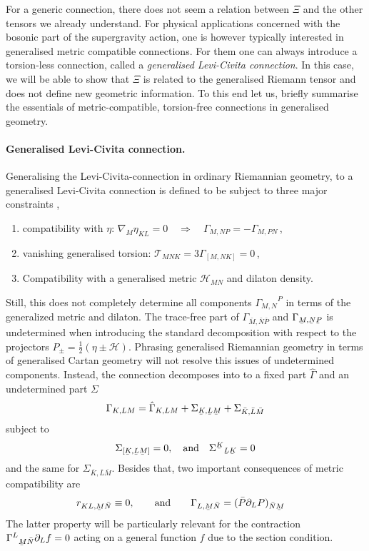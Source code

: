 \documentclass[11pt,a4paper]{article}
\numberwithin{equation}{section}
\newcommand{\ubar}[1]{\underaccent{\bar}{#1}}
\newcommand{\bN}{\bar{N}}
\newcommand{\bP}{\bar{P}}
\newcommand{\ubK}{\ubar{K}}
\newcommand{\ubL}{\ubar{L}}
\newcommand{\ubM}{\ubar{M}}
\newcommand{\ubN}{\ubar{N}}
\newcommand{\ubP}{\ubar{P}}
\begin{document}
For a generic connection, there does not seem a relation between $\Xi$ and the other tensors we already understand. For physical applications concerned with the bosonic part of the supergravity action, one is however typically interested in generalised metric compatible connections. For them one can always introduce a torsion-less connection, called a \textit{generalised Levi-Civita connection}. In this case, we will be able to show that $\Xi$ is related to the generalised Riemann tensor and does not define new geometric information. To this end let us, briefly summarise the essentials of metric-compatible, torsion-free connections in generalised geometry.

\paragraph{Generalised Levi-Civita connection.} Generalising the Levi-Civita-connection in ordinary Riemannian geometry, to a generalised Levi-Civita connection is defined to be subject to three major constraints \cite{Hohm:2011si},
\begin{enumerate}
  \item compatibility with $\eta$: $\nabla_M \eta_{KL} = 0 \quad \Rightarrow \quad \Gamma_{M,NP} = - \Gamma_{M,PN}$\,,
  \item vanishing generalised torsion: $\mathcal{T}_{MNK} = 3 \Gamma_{[M,NK]} = 0$\,,
  \item Compatibility with a generalised metric $\mathcal{H}_{MN}$ and dilaton density.
\end{enumerate}
Still, this does not completely determine all components ${\Gamma_{M,N}}^P$ in terms of the generalized metric and dilaton. The trace-free part of $\Gamma_{\bar{M},\bar{N} \bar{P}}$ and $\Gamma_{\ubM,\ubN \ubP}$ is undetermined when introducing the standard decomposition with respect to the projectors $P_\pm = \frac{1}{2} \left( \eta \pm \mathcal{H} \right)$. Phrasing generalised Riemannian geometry in terms of generalised Cartan geometry will not resolve this issues of undetermined components. Instead, the connection decomposes into to a fixed part $\hat{\Gamma}$ and an undetermined part $\Sigma$
\begin{equation}
  \Gamma_{K,LM} = \hat{\Gamma}_{K,LM} + \Sigma_{\ubK,\ubL \ubM} + \Sigma_{\bar{K},\bar{L}\bar{M}}
\end{equation}
subject to 
\begin{equation}
	\Sigma_{ [\ubK, \ubL \ubM]} = 0 , \quad \text{and} \quad {\Sigma^{\ubK}}_{\ubL\ubK} = 0 
\end{equation}
and the same for $\Sigma_{\bar{K},\bar{L}\bar{M}}$. Besides that, two important  consequences of metric compatibility are
\begin{align}
  r_{KL,\ubM\bN} &\equiv 0, \qquad \text{and} \qquad 
  \Gamma_{L,\ubM\bN} = (\bP \partial_L P)_{\bN \ubM} \label{eq:MetricComp}
\end{align}
The latter property will be particularly relevant for the contraction ${\Gamma^L}_{\ubM\bN} \partial_L f = 0$ acting on a general function $f$ due to the section condition.
\end{document}
